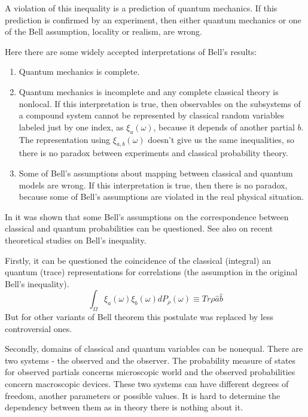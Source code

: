 \documentclass[%
master,         %
subf,           %
href,           %
colorlinks=true %
]{disser}
\numberwithin{equation}{section}
\numberwithin{figure}{section}
\begin{document}
A violation of this inequality is a prediction of quantum mechanics. If this prediction is confirmed by an experiment, then either quantum mechanics or one of the Bell assumption, locality or realism, are wrong.

Here there are some widely accepted interpretations of Bell's results:
\begin{enumerate}
\item Quantum mechanics is complete.

\item Quantum mechanics is incomplete and any complete classical theory is nonlocal.
If this interpretation is true, then observables on the subsystems of a compound system cannot be represented by classical random variables labeled just by one index, as $\xi_a(\omega)$, because  it depends of another partial $b$. The representation using $\xi_{a,b}(\omega)$ doesn't give us the same inequalities, so there is no paradox between experiments and classical probability theory.

\item Some of Bell's assumptions about mapping between classical and quantum models are wrong. If this interpretation is true, then there is no paradox, because some of Bell's assumptions are violated in the real physical situation.
\end{enumerate}

In \cite{Khrennikov_information, khrennikov_contextual} it was shown that some Bell's assumptions on the correspondence between classical and quantum probabilities can be questioned. See also \cite{L2, AD1, Lo, KV1, Hess, Hess1, Hess2, Gill13, Gill14, SCheid, Marian, ENTROPY} on recent theoretical studies on Bell's inequality.

Firstly, it can be questioned the coincidence of the classical (integral) an quantum (trace) representations for correlations (the assumption in the original Bell's inequality).
$$\int_\Omega\xi_a(\omega)\xi_b(\omega)dP_\rho(\omega) \equiv Tr\rho\hat{a}\hat{b}$$
But for other variants of Bell theorem this postulate was replaced by less controversial ones.

Secondly, domains of classical and quantum variables can be nonequal. There are two systems - the observed and the observer. The probability measure of states for observed partials concerns microscopic world and the observed probabilities concern macroscopic devices. These two systems can have different degrees of freedom, another parameters or possible values. It is hard to determine the dependency between them as in theory there is nothing about it.
\end{document}
